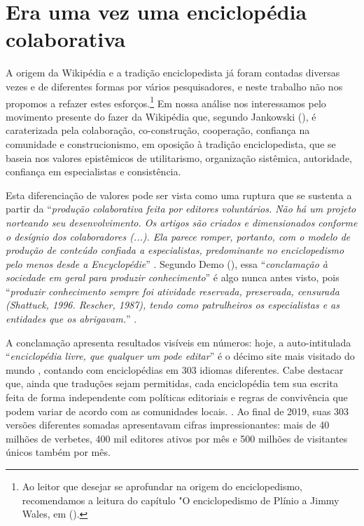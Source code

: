 \section{Era uma vez uma enciclopédia colaborativa}

A origem da Wikipédia e a tradição enciclopedista já foram contadas diversas vezes e de diferentes formas por vários pesquisadores, e neste trabalho não nos propomos a refazer estes esforços.\footnote{Ao leitor que desejar se aprofundar na origem do enciclopedismo, recomendamos a leitura do capítulo "O enciclopedismo de Plínio a Jimmy Wales, em (\cite{esteves_as_2014}).} Em nossa análise nos interessamos pelo movimento presente do fazer da Wikipédia que, segundo Jankowski (\citeyear{jankowski_wikipedia_2013}), é caraterizada pela colaboração, co-construção, cooperação, confiança na comunidade e construcionismo, em oposição à tradição enciclopedista, que se baseia nos valores epistêmicos de utilitarismo, organização sistêmica, autoridade, confiança em especialistas e consistência.

Esta diferenciação de valores pode ser vista como uma ruptura que se sustenta a partir da ``\textit{produção colaborativa feita por editores voluntários. Não há um projeto norteando seu desenvolvimento. Os artigos são criados e dimensionados conforme o desígnio dos colaboradores (...). Ela parece romper, portanto, com o modelo de produção de conteúdo confiada a especialistas, predominante no enciclopedismo pelo menos desde a Encyclopédie}''  \citep[p.61]{esteves_as_2014}. Segundo Demo (\citeyear{demo_conhecimento_2009}), essa ``\textit{conclamação à sociedade em geral para produzir conhecimento}'' é algo nunca antes visto, pois ``\textit{produzir conhecimento sempre foi atividade reservada, preservada, censurada (Shattuck, 1996. Rescher, 1987), tendo como patrulheiros os especialistas e as entidades que os abrigavam.}'' \citep{demo_conhecimento_2009}.

A conclamação apresenta resultados visíveis em números: hoje, a auto-intitulada ``\textit{enciclopédia livre, que qualquer um pode editar}'' é o décimo site mais visitado do mundo \citep{alexa_2019}, contando com enciclopédias em 303 idiomas diferentes. Cabe destacar que, ainda que traduções sejam permitidas, cada enciclopédia tem sua escrita feita de forma independente   com políticas editoriais e regras de convivência que podem variar de acordo com as comunidades locais. \citep{marques_wikipedia_2013}. Ao final de 2019, suas 303 versões diferentes somadas apresentavam cifras impressionantes: mais de 40 milhões de verbetes, 400 mil editores ativos por mês e 500 milhões de visitantes únicos também por mês. \citep{wikimedia_stats_2019}

